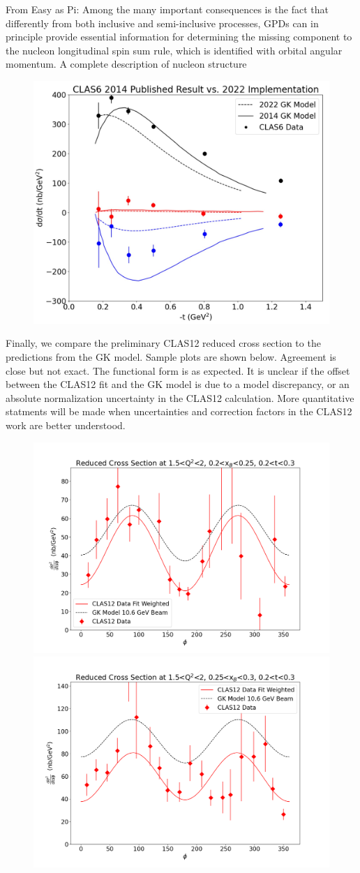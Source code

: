     
    From Easy as Pi:
    Among the many important consequences is the fact that differently from both inclusive and semi-inclusive processes, GPDs can in principle provide essential information
    for determining the missing component to the nucleon longitudinal spin sum rule, which
    is identified with orbital angular momentum. A complete description of nucleon structure
    
    
    \begin{figure}[hbt]
    	\centering
    	\includegraphics[page=6,width=0.6\linewidth]{Chapters/Ch5-Further/GK_model/pics/2022_vs_2014_GK_model.jpg}
    \end{figure}\label{fig:oldres2}
    
    Finally, we compare the preliminary CLAS12 reduced cross section to the predictions from the GK model. Sample plots are shown below. Agreement is close but not exact. The functional form is as expected. It is unclear if the offset between the CLAS12 fit and the GK model is due to a model discrepancy, or an absolute normalization uncertainty in the CLAS12 calculation. More quantitative statments will be made when uncertainties and correction factors in the CLAS12 work are better understood.
    \begin{figure}[hbt]
    	\centering
    	\includegraphics[page=6,width=0.45\linewidth]{Chapters/Ch5-Further/GK_model/pics/reduced_xsec_1.5_2_0.2_0.25_0.2_0.3.png}
    	\includegraphics[page=6,width=0.45\linewidth]{Chapters/Ch5-Further/GK_model/pics/reduced_xsec_1.5_2_0.25_0.3_0.2_0.3.png}
    \end{figure}\label{fig:oldres4}
    

